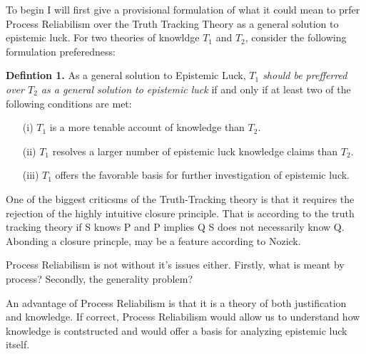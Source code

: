\documentclass{article}
\begin{document}
To begin I will first give a provisional formulation of what it could mean to
prfer Process Reliabilism over the Truth Tracking Theory as a general solution to epistemic luck.
For two theories of knowldge $T_{1}$ and $T_{2}$, consider the following
formulation preferedness:
\begin{displayquote}
    \textbf{Defintion 1.} As a general solution to Epistemic Luck,
    \textit{$T_{1}$ should be prefferred over $T_{2}$ as a general solution
    to epistemic luck} if and only if at least two of the following conditions are met:
    \begin{enumerate}
        \item[(i)] $T_{1}$ is a more tenable account of knowledge than $T_{2}$.
        \item[(ii)] $T_{1}$ resolves a larger number of epistemic luck knowledge claims than $T_{2}$.
        \item[(iii)] $T_{1}$ offers the favorable basis for further investigation of epistemic luck.
    \end{enumerate}
\end{displayquote}


One of the biggest criticsms of the Truth-Tracking theory is that it requires
the rejection of the highly intuitive closure principle. That is according
to the truth tracking theory if S knows P and P implies Q S does not necessarily know Q.
Abonding a closure princple, may be a feature according to Nozick.


Process Reliabilism is not without it's issues either.
Firstly, what is meant by process?
Secondly, the generality problem?

An advantage of Process Reliabilism is that it is a theory of both
justification and knowledge. If correct, Process Reliabilism would
allow us to understand how knowledge is contstructed and would
offer a basis for analyzing epistemic luck itself. %
\end{document}
